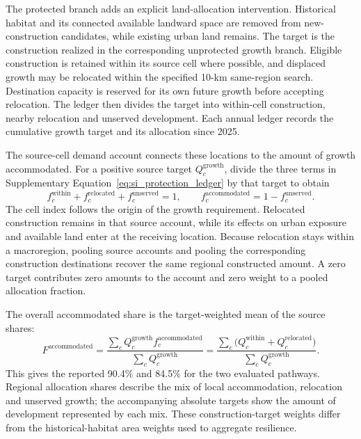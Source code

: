 The protected branch adds an explicit land-allocation intervention. Historical habitat and its connected available landward space are removed from new-construction candidates, while existing urban land remains. The target is the construction realized in the corresponding unprotected growth branch. Eligible construction is retained within its source cell where possible, and displaced growth may be relocated within the specified 10-km same-region search. Destination capacity is reserved for its own future growth before accepting relocation. The ledger then divides the target into within-cell construction, nearby relocation and unserved development. Each annual ledger records the cumulative growth target and its allocation since 2025.

The source-cell demand account connects these locations to the amount of growth accommodated. For a positive source target $Q_c^{\mathrm{growth}}$, divide the three terms in Supplementary Equation~\eqref{eq:si_protection_ledger} by that target to obtain
\[
f_c^{\mathrm{within}}+f_c^{\mathrm{relocated}}+f_c^{\mathrm{unserved}}=1,\qquad
f_c^{\mathrm{accommodated}}=1-f_c^{\mathrm{unserved}}.
\]
The cell index follows the origin of the growth requirement. Relocated construction remains in that source account, while its effects on urban exposure and available land enter at the receiving location. Because relocation stays within a macroregion, pooling source accounts and pooling the corresponding construction destinations recover the same regional constructed amount. A zero target contributes zero amounts to the account and zero weight to a pooled allocation fraction.

The overall accommodated share is the target-weighted mean of the source shares:
\[
F^{\mathrm{accommodated}}
=\frac{\sum_c Q_c^{\mathrm{growth}}f_c^{\mathrm{accommodated}}}
       {\sum_c Q_c^{\mathrm{growth}}}
=\frac{\sum_c\bigl(Q_c^{\mathrm{within}}+Q_c^{\mathrm{relocated}}\bigr)}
       {\sum_c Q_c^{\mathrm{growth}}}.
\]
This gives the reported 90.4\% and 84.5\% for the two evaluated pathways. Regional allocation shares describe the mix of local accommodation, relocation and unserved growth; the accompanying absolute targets show the amount of development represented by each mix. These construction-target weights differ from the historical-habitat area weights used to aggregate resilience.

